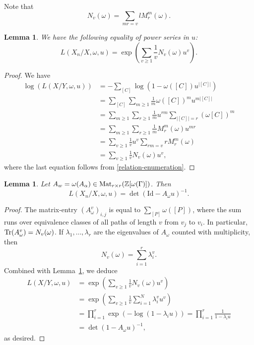 \documentclass[11pt]{amsart}
\newtheorem{lemma}[theorem]{Lemma}
\numberwithin{equation}{section}
\theoremstyle{remark}
\newcommand{\?}{\stackrel{?}{=}}
\newcommand{\Z}{\mathbb{Z}}
\begin{document}
Note that 
\begin{equation}
    \label{relation-enumeration}
    N_v(\omega)=\sum_{mr=v}lM^m_r(\omega). 
\end{equation}
\begin{lemma}\label{lem:L-exp}
We have the following equality of power series in $u$:
    \[L(X_n/X,\omega,u)=\exp\left(\sum_{v\ge 1}\frac{1}{v}N_v(\omega)u^v\right).\]
\end{lemma}
\begin{proof}
    We have
    \begin{align*}
        \log(L(X/Y,\omega,u))&=-\sum_{[C]}\log(1-\omega([C])u^{\vert [C]\vert})\\
        &=\sum_{[C]}\sum_{m\ge 1} \frac{1}{m}\omega([C])^mu^{m\vert [C]\vert}\\
        &=\sum_{m\ge 1}\sum_{r\ge 1}\frac{1}{m}u^{rm}\sum_{\vert[C]\vert=r}(\omega[C])^m\\
        &=\sum_{m\ge 1}\sum_{r\ge 1}\frac{1}{m}M_r^m(\omega)u^{mr}\\
        &=\sum_{v\ge 1}\frac{1}{v}u^v\sum_{rm=v}rM_r^m(\omega)\\
        &=\sum_{v\ge 1}\frac{1}{v}N_v(\omega)u^v,
    \end{align*}
    where the last equation follows from \eqref{relation-enumeration}.
\end{proof}

\begin{lemma}
\label{description-asmatrix}Let $A_w=\omega(A_\alpha)\in \textup{Mat}_{r\times r}(\Z[\omega(\Gamma)])$. Then 
    \[L(X_n/X,\omega,u)=\det(\mathrm{Id}-A_\omega u)^{-1}.\]
\end{lemma}
\begin{proof}
The matrix-entry $(A_\omega^v)_{i,j}$ is equal to $\sum_{[P]}\omega([P])$, where the sum runs over equivalence classes of all paths of length $v$ from $v_j$ to $v_i$. In particular, $\textup{Tr}(A_\omega^v)=N_v(\omega)$. 
    If $\lambda_1,\dots ,\lambda_r$ are the eigenvalues of $A_\omega$ counted with multiplicity, then  $$ N_v(\omega)=\sum_{i=1}^r\lambda_i^v.$$ Combined with Lemma~\ref{lem:L-exp}, we deduce
    \begin{align*}
        L(X/Y,\omega,u)&=\exp\left( \sum_{v\ge 1}\frac{1}{v}N_v(\omega)u^v\right) \\
        &=\exp\left( \sum_{v\ge 1}\frac{1}{v}\sum_{i=1}^N\lambda_i^vu^v\right)\\
        &=\prod_{i=1}^r\exp(-\log(1-\lambda_i u))=\prod_{i=1}^r\frac{1}{1-\lambda_i u}\\
        &=\det(1-A_\omega u)^{-1},
    \end{align*}
    as desired.
\end{proof}
\end{document}
